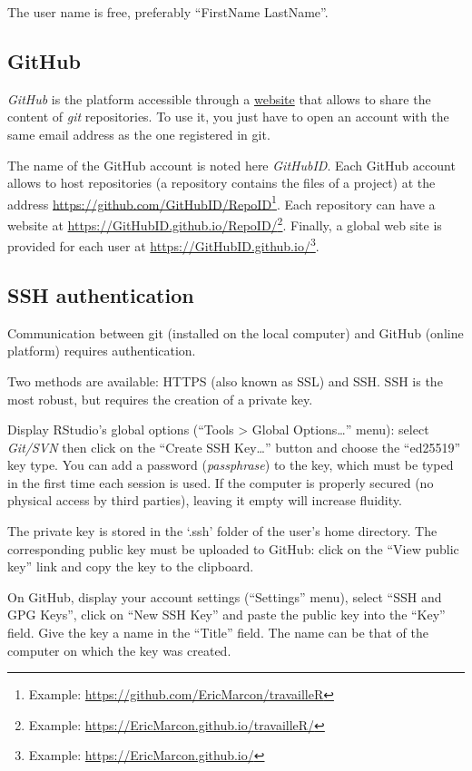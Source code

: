 \documentclass[
  12pt,
  american,
  a4paper,
  extrafontsizes,onecolumn,openright
  ]{memoir}
\begin{document}
The user name is free, preferably \enquote{FirstName LastName}.

\subsection{GitHub}\label{github}

\emph{GitHub} is the platform accessible through a \href{https://github.com/}{website} that allows to share the content of \emph{git} repositories.
To use it, you just have to open an account with the same email address as the one registered in git.

The name of the GitHub account is noted here \emph{GitHubID}.
Each GitHub account allows to host repositories (a repository contains the files of a project) at the address \url{https://github.com/GitHubID/RepoID}\footnote{Example: \url{https://github.com/EricMarcon/travailleR}}.
Each repository can have a website at \url{https://GitHubID.github.io/RepoID/}\footnote{Example: \url{https://EricMarcon.github.io/travailleR/}}.
Finally, a global web site is provided for each user at \url{https://GitHubID.github.io/}\footnote{Example: \url{https://EricMarcon.github.io/}}.

\subsection{SSH authentication}\label{sec:SSH}

Communication between git (installed on the local computer) and GitHub (online platform) requires authentication.

Two methods are available: HTTPS (also known as SSL) and SSH.
SSH is the most robust, but requires the creation of a private key.

Display RStudio's global options (\enquote{Tools \textgreater{} Global Options\ldots{}} menu): select \emph{Git/SVN} then click on the \enquote{Create SSH Key\ldots{}} button and choose the \enquote{ed25519} key type.
You can add a password (\emph{passphrase}) to the key, which must be typed in the first time each session is used.
If the computer is properly secured (no physical access by third parties), leaving it empty will increase fluidity.

The private key is stored in the `.ssh' folder of the user's home directory.
The corresponding public key must be uploaded to GitHub: click on the \enquote{View public key} link and copy the key to the clipboard.

On GitHub, display your account settings (\enquote{Settings} menu), select \enquote{SSH and GPG Keys}, click on \enquote{New SSH Key} and paste the public key into the \enquote{Key} field.
Give the key a name in the \enquote{Title} field.
The name can be that of the computer on which the key was created.
\end{document}
